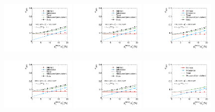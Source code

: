 \begin{figure}[!h]
 \centering
    \includegraphics[width=0.32\textwidth]{figures/resolution/results/JER_for_3_eta_bin_6_pTGamma_bin_all_contributions_PFCHS_RMS99_mc.pdf}
    \includegraphics[width=0.32\textwidth]{figures/resolution/results/JER_for_3_eta_bin_7_pTGamma_bin_all_contributions_PFCHS_RMS99_mc.pdf}
    \includegraphics[width=0.32\textwidth]{figures/resolution/results/JER_for_3_eta_bin_8_pTGamma_bin_all_contributions_PFCHS_RMS99_mc.pdf}

    \includegraphics[width=0.32\textwidth]{figures/resolution/results/JER_for_3_eta_bin_9_pTGamma_bin_all_contributions_PFCHS_RMS99_mc.pdf}
    \includegraphics[width=0.32\textwidth]{figures/resolution/results/JER_for_3_eta_bin_10_pTGamma_bin_all_contributions_PFCHS_RMS99_mc.pdf}
    \includegraphics[width=0.32\textwidth]{figures/resolution/results/JER_for_3_eta_bin_11_pTGamma_bin_all_contributions_PFCHS_RMS99_mc.pdf}


\end{figure}
